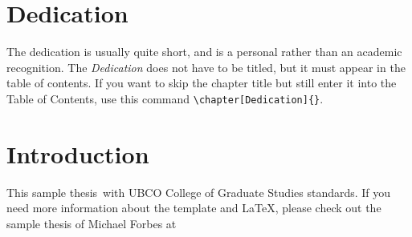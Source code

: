\documentclass[msc,oneside]{ubcthesis}%
\begin{document}
\chapter{Dedication} %
The dedication is usually quite short, and is a personal rather than
an academic recognition.  The \emph{Dedication} does not have to be
titled, but it must appear in the table of contents.  If you want to
skip the chapter title but still enter it into the Table of Contents,
use this command \verb|\chapter[Dedication]{}|.




\mainmatter


\chapter{Introduction}
This sample thesis\  with UBCO College of Graduate Studies standards. If you need more information about the template and LaTeX, please check out the sample thesis of Michael Forbes at





\end{document}

